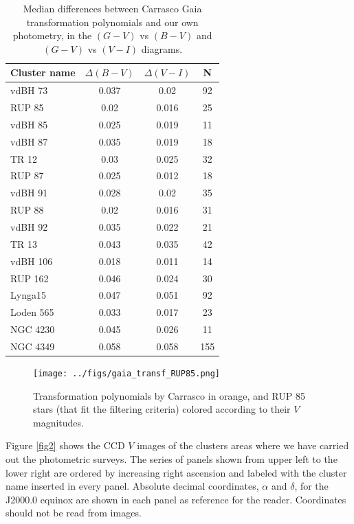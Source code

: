 \documentclass[draft]{aa}
\begin{document}
\begin{table}[ht]
    \centering
    \begin{tabular}{lccc}
    \hline
    Cluster name & $\Delta (B-V)$ & $\Delta (V-I)$ & N \\
    \hline \hline
    vdBH 73 & 0.037 & 0.02 & 92\\
    RUP 85 & 0.02 & 0.016 & 25\\
    vdBH 85 & 0.025 & 0.019 & 11\\
    vdBH 87 & 0.035 & 0.019 & 18\\
    TR 12 & 0.03 & 0.025 & 32\\
    RUP 87 & 0.025 & 0.012 & 18\\
    vdBH 91 & 0.028 & 0.02 & 35\\
    RUP 88 & 0.02 & 0.016 & 31\\
    vdBH 92 & 0.035 & 0.022 & 21\\
    TR 13 & 0.043 & 0.035 & 42\\
    vdBH 106 & 0.018 & 0.011 & 14\\
    RUP 162 & 0.046 & 0.024 & 30\\
    Lynga15 & 0.047 & 0.051 & 92\\
    Loden 565 & 0.033 & 0.017 & 23\\
    NGC 4230 & 0.045 & 0.026 & 11\\
    NGC 4349 & 0.058 & 0.058 & 155\\
    \hline
    \end{tabular}
    \caption{Median differences between Carrasco Gaia transformation
    polynomials and our own photometry, in the $(G-V)$ vs $(B-V)$ and
    $(G-V)$ vs $(V-I)$ diagrams.}
    \label{tab:gaia_diffs}
\end{table}

\begin{figure}[ht]
    \centering
     \texttt{[image: ../figs/gaia\_transf\_RUP85.png]}   
     \caption{Transformation polynomials by Carrasco in orange, and RUP 85 stars
     (that fit the filtering criteria) colored according to their $V$
     magnitudes.}
    \label{fig:gaia_transf}
\end{figure}

Figure \ref{fig2} shows the CCD $V$ images of the clusters areas where we have
carried out the photometric surveys. The series of panels shown from upper left
to the lower right are ordered by increasing right ascension and labeled with
the cluster name inserted in every panel. Absolute decimal
coordinates, $\alpha$ and $\delta$, for the J2000.0 equinox are shown in each
panel as reference for the reader. Coordinates should not be read from
images.\\
\end{document}
